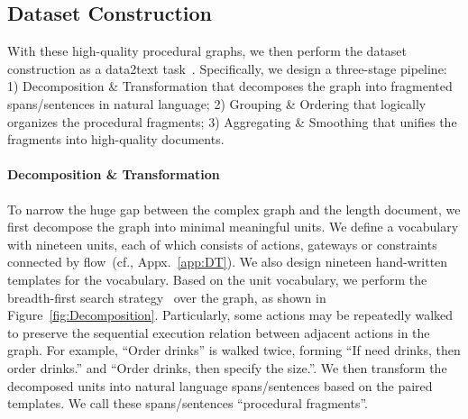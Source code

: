 
\subsection{Dataset Construction
}

With these high-quality procedural graphs, we then perform the dataset construction as a data2text task~\cite{lin2023survey}. Specifically, {we design a three-stage pipeline: 1) Decomposition \& Transformation that decomposes the graph into fragmented spans/sentences in natural language; 2) Grouping \& Ordering that logically organizes the procedural fragments; 3) Aggregating \& Smoothing that unifies the fragments into high-quality documents}.

\paragraph{Decomposition \& Transformation}

To narrow the huge gap between the complex graph and the length document, we first decompose the graph into minimal meaningful units. We define a vocabulary with nineteen units, each of which consists of actions, gateways or constraints connected by flow~(cf., Appx.~\ref{app:DT}). We also design nineteen hand-written templates for the vocabulary. Based on the unit vocabulary, we perform the breadth-first search strategy~\cite{10.1016/0004-3702(85)90084-0} over the graph, as shown in Figure~\ref{fig:Decomposition}. Particularly, some actions may be repeatedly walked to preserve the sequential execution relation between adjacent actions in the graph. For example, ``Order drinks'' is walked twice, forming ``If need drinks, then order drinks.'' and ``Order drinks, then specify the size.''. We then transform the decomposed units into natural language spans/sentences based on the paired templates. We call these spans/sentences ``procedural fragments''.

